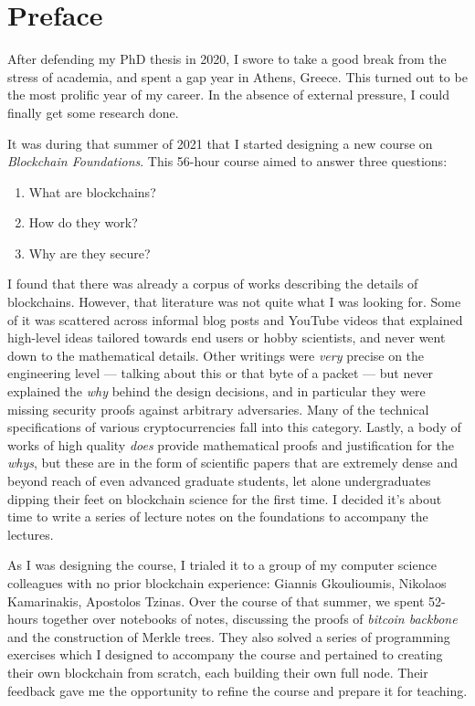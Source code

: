 \chapter*{Preface}

After defending my PhD thesis in 2020, I swore to take a good break
from the stress of academia, and spent a gap year in Athens, Greece.
This turned out to be the most prolific year of my career. In the absence
of external pressure, I could finally get some research done.

It was during that summer of 2021 that I started designing a new course on
\emph{Blockchain Foundations}. This 56-hour course aimed to answer
three questions:

\begin{enumerate}
  \item What are blockchains?
  \item How do they work?
  \item Why are they secure?
\end{enumerate}

I found that there was already a corpus of works describing the
details of blockchains. However, that literature was not quite what
I was looking for. Some of it was scattered across informal blog posts
and YouTube videos
that explained high-level ideas tailored towards end users or
hobby scientists, and never went down to the mathematical details.
Other writings were \emph{very} precise on the engineering level
--- talking about this or that byte of a packet --- but never explained
the \emph{why} behind the design decisions, and in particular they
were missing security proofs against arbitrary adversaries.
Many of the technical specifications of various cryptocurrencies
fall into this category.
Lastly, a body of works of high quality \emph{does} provide mathematical
proofs and justification
for the \emph{whys}, but these are in the form of scientific papers
that are extremely dense and beyond reach of even advanced graduate
students, let alone undergraduates dipping their feet on blockchain
science for the first time. I decided it's about time to write a
series of lecture notes on the foundations to accompany the lectures.

As I was designing the course, I trialed it to a group of my computer
science colleagues with no prior blockchain experience:
Giannis Gkoulioumis, Nikolaos Kamarinakis, Apostolos Tzinas.
Over the course of that summer, we spent 52-hours together over notebooks
of notes, discussing the proofs of \emph{bitcoin backbone} and the
construction of Merkle trees. They also solved a series of programming
exercises which I designed to accompany the course and pertained to
creating their own blockchain from scratch, each building their own
full node. Their feedback gave me the opportunity to refine the course
and prepare it for teaching.

